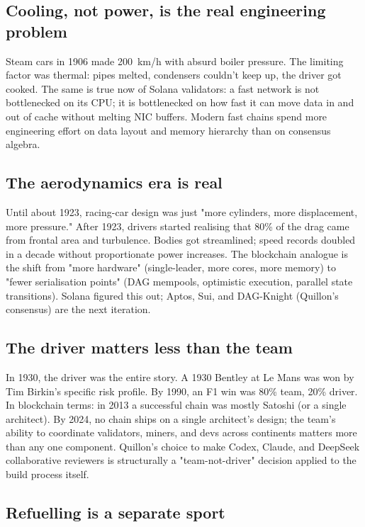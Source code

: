 \documentclass[11pt,a4paper]{article}
\begin{document}
\subsection{Cooling, not power, is the real engineering problem}

Steam cars in 1906 made 200~km/h with absurd boiler pressure. The
limiting factor was thermal: pipes melted, condensers couldn't keep up,
the driver got cooked. The same is true now of Solana validators: a
fast network is not bottlenecked on its CPU; it is bottlenecked on
how fast it can move data in and out of cache without melting NIC
buffers. Modern fast chains spend more engineering effort on data layout
and memory hierarchy than on consensus algebra.

\subsection{The aerodynamics era is real}

Until about 1923, racing-car design was just "more cylinders, more
displacement, more pressure." After 1923, drivers started realising
that 80\% of the drag came from frontal area and turbulence. Bodies got
streamlined; speed records doubled in a decade without proportionate
power increases. The blockchain analogue is the shift from "more
hardware" (single-leader, more cores, more memory) to "fewer
serialisation points" (DAG mempools, optimistic execution, parallel
state transitions). Solana figured this out; Aptos, Sui, and
DAG-Knight (Quillon's consensus) are the next iteration.

\subsection{The driver matters less than the team}

In 1930, the driver was the entire story. A 1930 Bentley at Le Mans was
won by Tim Birkin's specific risk profile. By 1990, an F1 win was 80\%
team, 20\% driver. In blockchain terms: in 2013 a successful chain was
mostly Satoshi (or a single architect). By 2024, no chain ships on a
single architect's design; the team's ability to coordinate validators,
miners, and devs across continents matters more than any one component.
Quillon's choice to make Codex, Claude, and DeepSeek collaborative
reviewers is structurally a "team-not-driver" decision applied to the
build process itself.

\subsection{Refuelling is a separate sport}
\end{document}
